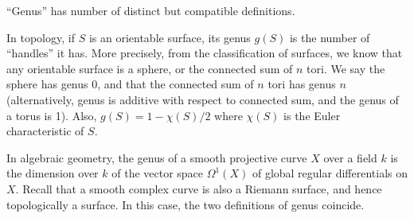 \documentclass{article}
\begin{document}
``Genus'' has number of distinct but compatible definitions.

In topology, if $S$ is an orientable surface, its genus $g(S)$ is the number of ``handles'' it has.
More precisely, from the classification of surfaces, we know that any orientable
surface is a sphere, or the connected sum of $n$ tori.  We say the sphere
has genus 0, and that the connected sum of $n$ tori has genus $n$ 
(alternatively, genus is additive with respect to connected sum, and the genus of a torus is 1).
Also, $g(S)=1-\chi(S)/2$ where $\chi(S)$ is the Euler characteristic of $S$. 

In algebraic geometry, the {genus} of a smooth projective curve $X$ over a field $k$ is the
dimension over $k$ of the vector space $\Omega^1(X)$ of global regular
differentials on $X$.  Recall that a smooth complex curve is also a Riemann surface,
and hence topologically a surface.  In this case, the two definitions of genus coincide.
\end{document}
